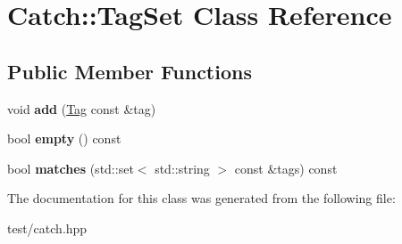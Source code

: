 \hypertarget{classCatch_1_1TagSet}{}\section{Catch\+:\+:Tag\+Set Class Reference}
\label{classCatch_1_1TagSet}
\subsection*{Public Member Functions}
\begin{DoxyCompactItemize}
\item 
void {\bfseries add} (\hyperlink{classCatch_1_1Tag}{Tag} const \&tag)\hypertarget{classCatch_1_1TagSet_aee4ac50048b95e38ee2ee90cdbd2f2d7}{}\label{classCatch_1_1TagSet_aee4ac50048b95e38ee2ee90cdbd2f2d7}

\item 
bool {\bfseries empty} () const \hypertarget{classCatch_1_1TagSet_aaa7ba754671a5ff17261f214adb9164c}{}\label{classCatch_1_1TagSet_aaa7ba754671a5ff17261f214adb9164c}

\item 
bool {\bfseries matches} (std\+::set$<$ std\+::string $>$ const \&tags) const \hypertarget{classCatch_1_1TagSet_a33fffe93717ff00ab9552a5e59ebeec1}{}\label{classCatch_1_1TagSet_a33fffe93717ff00ab9552a5e59ebeec1}

\end{DoxyCompactItemize}


The documentation for this class was generated from the following file\+:\begin{DoxyCompactItemize}
\item 
test/catch.\+hpp\end{DoxyCompactItemize}
